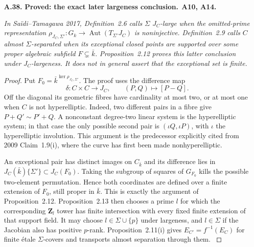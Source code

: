 \documentclass[11pt,a4paper]{article}
\newcommand{\Z}{\mathbf Z}
\newcommand{\Aut}{\operatorname{Aut}}
\newenvironment{claim}[3]{\par\medskip\noindent\hypertarget{#1}{\textbf{#1. #2.}}\ \textbf{#3.}\par\nopagebreak\smallskip\begingroup\itshape}{\endgroup\par\smallskip}
\begin{document}
\begin{claim}{A.38}{Proved: the exact later largeness conclusion}{A10, A14}
In Sa\"idi--Tamagawa 2017, Definition~2.6 calls $\Sigma$ $J_C$-large
when the omitted-prime representation
$\rho_{J_C,\Sigma'}:G_k\to\Aut(T_{\Sigma'}J_C)$ is noninjective.
Definition~2.9 calls $C$ almost $\Sigma$-separated when its exceptional
closed points are supported over some proper algebraic subfield
$F\subsetneq\bar k$. Proposition~2.12 proves this latter conclusion
under $J_C$-largeness. It does not in general assert that the
exceptional set is finite.
\end{claim}
\begin{proof}
Put $F_0=\bar k^{\ker\rho_{J_C,\Sigma'}}$. The proof uses the difference
map
\[
 \delta:C\times C\longrightarrow J_C,\qquad (P,Q)\longmapsto[P-Q].
\]
Off the diagonal its geometric fibres have cardinality at most two,
or at most one when $C$ is not hyperelliptic. Indeed, two different
pairs in a fibre give $P+Q'\sim P'+Q$. A nonconstant degree-two linear
system is the hyperelliptic system; in that case the only possible
second pair is $(\iota Q,\iota P)$, with $\iota$ the hyperelliptic
involution. This argument is the predecessor explicitly cited from
2009 Claim~1.9(i), where the curve has first been made
nonhyperelliptic.

An exceptional pair has distinct images on $C_{\bar k}$ and its
difference lies in $J_C(\bar k)\{\Sigma'\}\subset J_C(F_0)$.
Taking the subgroup of squares of $G_{F_0}$ kills the possible
two-element permutation. Hence both coordinates are defined over a
finite extension of $F_0$, still proper in $\bar k$. This is exactly
the argument of Proposition~2.12. Proposition~2.13 then chooses a prime
$l$ for which the corresponding $\Z_l$ tower has finite intersection
with every fixed finite extension of that support field. It may choose
$l\in\Sigma\cup\{p\}$ under largeness, and $l\in\Sigma$ if the
Jacobian also has positive $p$-rank. Proposition~2.11(i) gives
$E_{C'}=f^{-1}(E_C)$ for finite \'etale $\Sigma$-covers and transports
almost separation through them.
\citep[Definitions~2.6,2.9 and Propositions~2.11--2.13]{LA_ST2017}
\end{proof}
\end{document}
